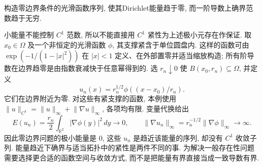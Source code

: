 \begin{example}\label{ex:dirichlet-bumps}
构造零边界条件的光滑函数序列, 使其Dirichlet能量趋于零, 而一阶导数上确界范数趋于无穷.
\end{example}
\begin{solution}
小能量不能控制 $C^1$ 范数, 所以不能直接用 $C^1$ 紧性为上述极小元存在作保证. 取 $x_0\in\Omega$ 及一个非恒定的光滑函数 $\phi$, 其支撑紧含于单位圆盘内. 这样的函数可由 $\exp(-1/(1-|x|^2))$ 在 $|x|<1$ 定义、在外部置零并适当缩放构造; 所有阶导数在边界趋零是由指数衰减快于任意幂得到的. 选 $r_n\downarrow0$ 使 $B(x_0,r_n)\subseteq\Omega$, 并定义
\[
 u_n(x)=r_n^{1/2}\phi((x-x_0)/r_n).
\]
它们在边界附近为零. 对这些有紧支撑的函数, 本例使用 $\lVert u\rVert_{C^1}=\lVert u\rVert_\infty+\lVert\nabla u\rVert_\infty$, 各项均有限. 变量代换给出
\[
 E(u_n)=\frac{r_n}{2}\int_{\mathbb R^2}|\nabla\phi(y)|^2\,dy\longrightarrow0,
 \qquad \lVert\nabla u_n\rVert_\infty=r_n^{-1/2}\lVert\nabla\phi\rVert_\infty\longrightarrow\infty.
\]
因此零边界问题的极小能量是 $0$, 这些 $u_n$ 是趋近该能量的序列, 却没有 $C^1$ 收敛子列. 能量趋近下确界与适当拓扑中的紧性是两件不同的事. 为解决一般存在性问题需要选择更合适的函数空间与收敛方式, 而不是把能量有界直接当成一致导数有界.
\end{solution}

